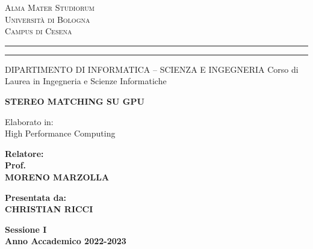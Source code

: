 \documentclass[12pt,a4paper,openright,twoside]{report}
\newcommand{\xstudent}{CHRISTIAN RICCI}
\newcommand{\xsupervisor}{MORENO MARZOLLA}
\begin{document}

\oddsidemargin=25pt

\begin{titlepage}
\begin{center}
    {\Large{\textsc{Alma Mater Studiorum}}}\\
    {\Large{\textsc{Universit\`a di Bologna}}} \\
    {\textsc{Campus di Cesena}}
    \rule[0.1cm]{14cm}{0.1mm}
    \rule[0.5cm]{14cm}{0.6mm}
    DIPARTIMENTO DI INFORMATICA – SCIENZA E INGEGNERIA
    Corso di Laurea in Ingegneria e Scienze Informatiche
\end{center}

\vspace{15mm}

\begin{center}
    {\LARGE{\bf STEREO MATCHING SU GPU}} \\
\end{center}

\vspace{15mm}

\begin{center}
     \large{ Elaborato in:\\ High Performance Computing\\}
\end{center}

\vspace{20mm}
\par
\noindent

\begin{minipage}[t]{0.47\textwidth}
    {\large{\bf Relatore:\\ Prof.\\ \xsupervisor}}
\end{minipage}
\hfill
\begin{minipage}[t]{0.47\textwidth}\raggedleft
    {\large{\bf Presentata da:\\ \xstudent}} \end{minipage}
\vspace{20mm}
\begin{center}
    \large{\bf Sessione I\\ Anno Accademico 2022-2023}
\end{center}

\clearpage{\pagestyle{empty}\cleardoublepage}
\end{titlepage}

\end{document}
